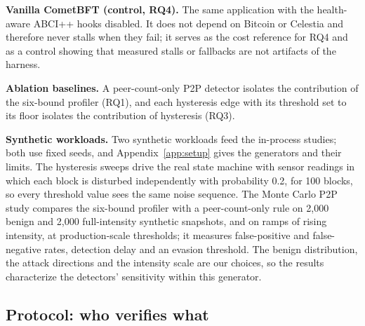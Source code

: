 \textbf{Vanilla CometBFT (control, RQ4).} The same application with the
health-aware ABCI++ hooks disabled. It does not depend on Bitcoin or
Celestia and therefore never stalls when they fail; it serves as the
cost reference for RQ4 and as a control showing that measured stalls or
fallbacks are not artifacts of the harness.

\textbf{Ablation baselines.} A peer-count-only P2P detector isolates the
contribution of the six-bound profiler (RQ1), and each hysteresis edge with
its threshold set to its floor isolates the contribution of hysteresis
(RQ3).

\textbf{Synthetic workloads.}\label{subsec:montecarlo} Two synthetic workloads feed the in-process studies; both use fixed seeds, and
Appendix~\ref{app:setup} gives the generators and their limits. The hysteresis
sweeps drive the real state machine with sensor readings in which each block is
disturbed independently with probability 0.2, for 100 blocks, so every threshold
value sees the same noise sequence. The Monte Carlo P2P study compares the
six-bound profiler with a peer-count-only rule on 2{,}000 benign and 2{,}000
full-intensity synthetic snapshots, and on ramps of rising intensity, at
production-scale thresholds; it measures false-positive and false-negative rates,
detection delay and an evasion threshold. The benign distribution, the attack
directions and the intensity scale are our choices, so the results characterize
the detectors' sensitivity within this generator.


\subsection*{Protocol: who verifies what}

